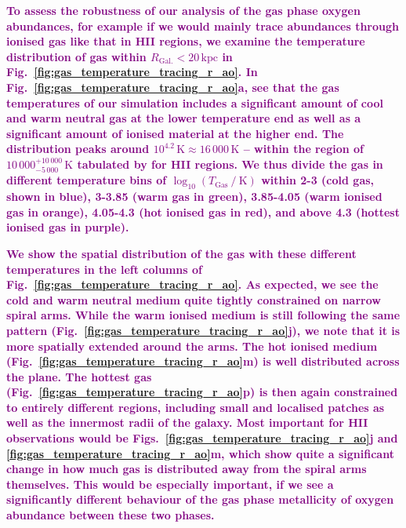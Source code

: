 \documentclass[twocolumn,apj,numberedappendix,appendixfloats,twocolappendix]{openjournal}
\newcommand{\adjusted}[1]{\textbf{\textcolor{purple}{#1}}}
\begin{document}
\adjusted{To assess the robustness of our analysis of the gas phase oxygen abundances, for example if we would mainly trace abundances through ionised gas like that in HII regions, we examine the temperature distribution of gas within $R_\mathrm{Gal.} < 20\,\mathrm{kpc}$ in Fig.~\ref{fig:gas_temperature_tracing_r_ao}. In Fig.~\ref{fig:gas_temperature_tracing_r_ao}a, see that the gas temperatures of our simulation includes a significant amount of cool and warm neutral gas at the lower temperature end as well as a significant amount of ionised material at the higher end. The distribution peaks around $10^{4.2}\,\mathrm{K} \approx 16\,000\,\mathrm{K}$ -- within the region of $10\,000_{-5\,000}^{+10\,000}\,\mathrm{K}$ tabulated by \citet{Osterbrock1989} for HII regions. We thus divide the gas in different temperature bins of $\log_{10} (T_\mathrm{Gas}~/~\mathrm{K})$ within 2-3 (cold gas, shown in blue), 3-3.85 (warm gas in green), 3.85-4.05 (warm ionised gas in orange), 4.05-4.3 (hot ionised gas in red), and above 4.3 (hottest ionised gas in purple).}

\adjusted{We show the spatial distribution of the gas with these different temperatures in the left columns of Fig.~\ref{fig:gas_temperature_tracing_r_ao}. As expected, we see the cold and warm neutral medium quite tightly constrained on narrow spiral arms. While the warm ionised medium is still following the same pattern (Fig.~\ref{fig:gas_temperature_tracing_r_ao}j), we note that it is more spatially extended around the arms. The hot ionised medium (Fig.~\ref{fig:gas_temperature_tracing_r_ao}m) is well distributed across the plane. The hottest gas (Fig.~\ref{fig:gas_temperature_tracing_r_ao}p) is then again constrained to entirely different regions, including small and localised patches as well as the innermost radii of the galaxy. Most important for HII observations would be Figs.~\ref{fig:gas_temperature_tracing_r_ao}j and \ref{fig:gas_temperature_tracing_r_ao}m, which show quite a significant change in how much gas is distributed away from the spiral arms themselves. This would be especially important, if we see a significantly different behaviour of the gas phase metallicity of oxygen abundance between these two phases.}
\end{document}
